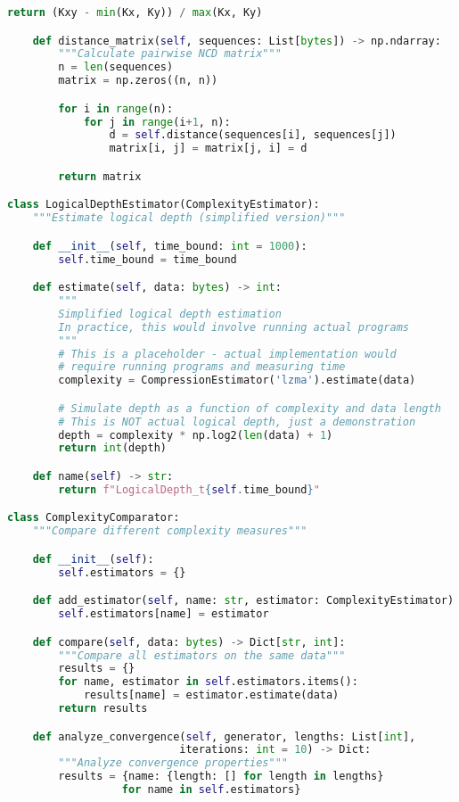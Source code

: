 \documentclass[12pt,a4paper]{report}
\begin{document}
\begin{lstlisting}[language=Python, caption=Complexity Estimation Framework]
        return (Kxy - min(Kx, Ky)) / max(Kx, Ky)

    def distance_matrix(self, sequences: List[bytes]) -> np.ndarray:
        """Calculate pairwise NCD matrix"""
        n = len(sequences)
        matrix = np.zeros((n, n))

        for i in range(n):
            for j in range(i+1, n):
                d = self.distance(sequences[i], sequences[j])
                matrix[i, j] = matrix[j, i] = d

        return matrix

class LogicalDepthEstimator(ComplexityEstimator):
    """Estimate logical depth (simplified version)"""

    def __init__(self, time_bound: int = 1000):
        self.time_bound = time_bound

    def estimate(self, data: bytes) -> int:
        """
        Simplified logical depth estimation
        In practice, this would involve running actual programs
        """
        # This is a placeholder - actual implementation would
        # require running programs and measuring time
        complexity = CompressionEstimator('lzma').estimate(data)

        # Simulate depth as a function of complexity and data length
        # This is NOT actual logical depth, just a demonstration
        depth = complexity * np.log2(len(data) + 1)
        return int(depth)

    def name(self) -> str:
        return f"LogicalDepth_t{self.time_bound}"

class ComplexityComparator:
    """Compare different complexity measures"""

    def __init__(self):
        self.estimators = {}

    def add_estimator(self, name: str, estimator: ComplexityEstimator):
        self.estimators[name] = estimator

    def compare(self, data: bytes) -> Dict[str, int]:
        """Compare all estimators on the same data"""
        results = {}
        for name, estimator in self.estimators.items():
            results[name] = estimator.estimate(data)
        return results

    def analyze_convergence(self, generator, lengths: List[int],
                           iterations: int = 10) -> Dict:
        """Analyze convergence properties"""
        results = {name: {length: [] for length in lengths}
                  for name in self.estimators}


\end{lstlisting}
\end{document}
